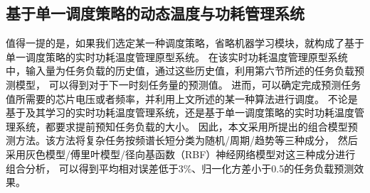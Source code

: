 \subsection{基于单一调度策略的动态温度与功耗管理系统}
值得一提的是，如果我们选定某一种调度策略，省略机器学习模块，就构成了基于单一调度策略的实时功耗温度管理原型系统。 在该实时功耗温度管理原型系统中，输入量为任务负载的历史值，通过这些历史值，利用第六节所述的任务负载预测模型， 可以得到对于下一时刻任务量的预测值。 进而，可以确定完成预测任务值所需要的芯片电压或者频率，并利用上文所述的某一种算法进行调度。
不论是基于及其学习的实时功耗温度管理系统，还是基于单一调度策略的实时功耗温度管理系统，都要求提前预知任务负载的大小。 因此，本文采用所提出的组合模型预测方法。该方法将复杂任务按频谱长短分类为随机/周期/趋势等三种成分， 然后采用灰色模型/傅里叶模型/径向基函数（RBF）神经网络模型对这三种成分进行组合分析， 可以得到平均相对误差低于3\%、归一化方差小于0.5的任务负载预测效果。 